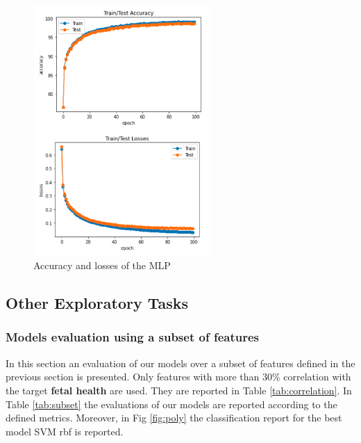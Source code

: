 \documentclass[a4paper,12pt]{article}
\begin{document}
\begin{figure}[H]
  \begin{center}
  \includegraphics[width=0.6\textwidth]{images/ann_train.png}
  \end{center}
  \caption{Accuracy and losses of the MLP}
  \label{fig:anntrain}
\end{figure}

\subsection{Other Exploratory Tasks}

\subsubsection{Models evaluation using a subset of features}

In this section an evaluation of our models over a subset of features defined in the previous section is presented. Only features with more than 30\% correlation with the target \textbf{fetal health} are used. They are reported in Table \ref{tab:correlation}. In Table \ref{tab:subset} the evaluations of our models are reported according to the defined metrics. Moreover, in Fig \ref{fig:poly} the classification report for the best model SVM rbf is reported.
\end{document}
